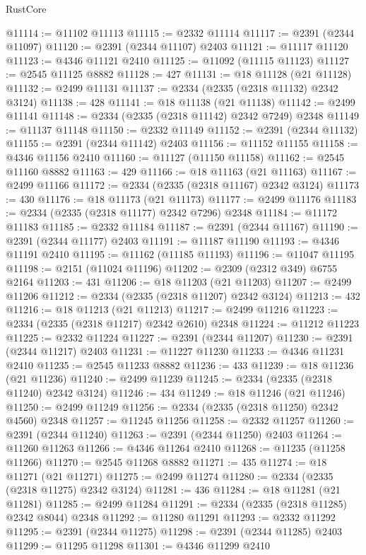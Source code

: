 \begin{lexlean}{RustCore}
\begin{coremodule}
@11114 := @11102 @11113
@11115 := @2332 @11114
@11117 := @2391 (@2344 @11097)
@11120 := @2391 (@2344 @11107) @2403
@11121 := @11117 @11120
@11123 := @4346 @11121 @2410
@11125 := @11092 (@11115 @11123)
@11127 := @2545 @11125 @8882
@11128 := 427
@11131 := @18 @11128 (@21 @11128)
@11132 := @2499 @11131
@11137 := @2334 (@2335 (@2318 @11132) @2342 @3124)
@11138 := 428
@11141 := @18 @11138 (@21 @11138)
@11142 := @2499 @11141
@11148 := @2334 (@2335 (@2318 @11142) @2342 @7249) @2348
@11149 := @11137 @11148
@11150 := @2332 @11149
@11152 := @2391 (@2344 @11132)
@11155 := @2391 (@2344 @11142) @2403
@11156 := @11152 @11155
@11158 := @4346 @11156 @2410
@11160 := @11127 (@11150 @11158)
@11162 := @2545 @11160 @8882
@11163 := 429
@11166 := @18 @11163 (@21 @11163)
@11167 := @2499 @11166
@11172 := @2334 (@2335 (@2318 @11167) @2342 @3124)
@11173 := 430
@11176 := @18 @11173 (@21 @11173)
@11177 := @2499 @11176
@11183 := @2334 (@2335 (@2318 @11177) @2342 @7296) @2348
@11184 := @11172 @11183
@11185 := @2332 @11184
@11187 := @2391 (@2344 @11167)
@11190 := @2391 (@2344 @11177) @2403
@11191 := @11187 @11190
@11193 := @4346 @11191 @2410
@11195 := @11162 (@11185 @11193)
@11196 := @11047 @11195
@11198 := @2151 (@11024 @11196)
@11202 := @2309 (@2312 @349) @6755 @2164
@11203 := 431
@11206 := @18 @11203 (@21 @11203)
@11207 := @2499 @11206
@11212 := @2334 (@2335 (@2318 @11207) @2342 @3124)
@11213 := 432
@11216 := @18 @11213 (@21 @11213)
@11217 := @2499 @11216
@11223 := @2334 (@2335 (@2318 @11217) @2342 @2610) @2348
@11224 := @11212 @11223
@11225 := @2332 @11224
@11227 := @2391 (@2344 @11207)
@11230 := @2391 (@2344 @11217) @2403
@11231 := @11227 @11230
@11233 := @4346 @11231 @2410
@11235 := @2545 @11233 @8882
@11236 := 433
@11239 := @18 @11236 (@21 @11236)
@11240 := @2499 @11239
@11245 := @2334 (@2335 (@2318 @11240) @2342 @3124)
@11246 := 434
@11249 := @18 @11246 (@21 @11246)
@11250 := @2499 @11249
@11256 := @2334 (@2335 (@2318 @11250) @2342 @4560) @2348
@11257 := @11245 @11256
@11258 := @2332 @11257
@11260 := @2391 (@2344 @11240)
@11263 := @2391 (@2344 @11250) @2403
@11264 := @11260 @11263
@11266 := @4346 @11264 @2410
@11268 := @11235 (@11258 @11266)
@11270 := @2545 @11268 @8882
@11271 := 435
@11274 := @18 @11271 (@21 @11271)
@11275 := @2499 @11274
@11280 := @2334 (@2335 (@2318 @11275) @2342 @3124)
@11281 := 436
@11284 := @18 @11281 (@21 @11281)
@11285 := @2499 @11284
@11291 := @2334 (@2335 (@2318 @11285) @2342 @8044) @2348
@11292 := @11280 @11291
@11293 := @2332 @11292
@11295 := @2391 (@2344 @11275)
@11298 := @2391 (@2344 @11285) @2403
@11299 := @11295 @11298
@11301 := @4346 @11299 @2410

\end{coremodule}
\end{lexlean}
